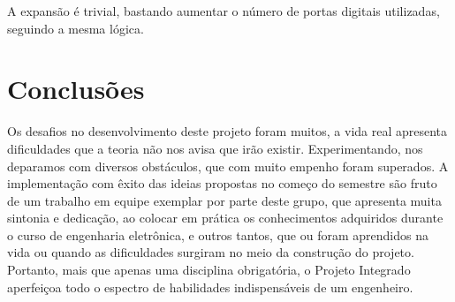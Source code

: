 \documentclass[a4paper,12pt]{report}
\begin{document}
	A expansão é trivial, bastando aumentar o número de portas digitais utilizadas, seguindo a mesma lógica.

\cleardoublepage
\chapter{Conclusões}
	\label{cap:Conclusoes}
 	Os desafios no desenvolvimento deste projeto foram muitos, a vida real apresenta dificuldades que a teoria não nos avisa que irão existir. Experimentando, nos deparamos com diversos obstáculos, que com muito empenho foram superados. A implementação com êxito das ideias propostas no começo do semestre são fruto de um trabalho em equipe exemplar por parte deste grupo, que apresenta muita sintonia e dedicação, ao colocar em prática os conhecimentos adquiridos durante o curso de engenharia eletrônica, e outros tantos, que ou foram aprendidos na vida ou quando as dificuldades surgiram no meio da construção do projeto. Portanto, mais que apenas uma disciplina obrigatória, o Projeto Integrado aperfeiçoa todo o espectro de habilidades indispensáveis de um engenheiro. 
 
 
 
%
%	
	
	
	
	
	
	
	
	
	
	
	
		
	
	
	
\end{document}
